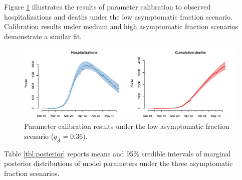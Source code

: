 \documentclass[11pt]{article}
\begin{document}
Figure \ref{fig:fit} illustrates the results of parameter calibration to observed hospitalizations and deaths under the low asymptomatic fraction scenario. 
Calibration results under medium and high asymptomatic fraction scenarios demonstrate a similar fit.

\begin{figure}[htb]
	\centering
	\includegraphics[width=.8\textwidth]{figures/calibration.pdf}
	\caption{Parameter calibration results under the low asymptomatic fraction scenario ($q_A = 0.36$).}
	\label{fig:fit}
\end{figure}


Table \ref{tbl:posterior} reports means and 95\% credible intervals of marginal posterior distributions of model parameters under the three asymptomatic fraction scenarios.
\end{document}
